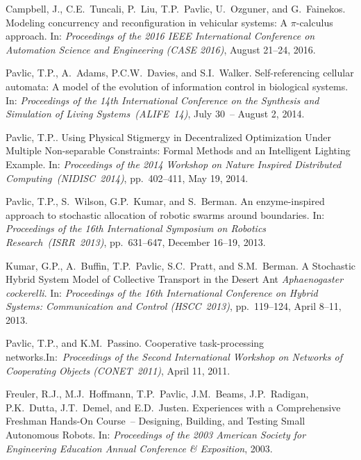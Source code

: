 \documentclass[10pt]{article}           %
\newcommand{\mathalt}[2]{#2}
\begin{document}
\begin{bibenum}
    \item Campbell, J., C.E.~Tuncali, P.~Liu, T.P.~Pavlic, U.~Ozguner,
        and G.~Fainekos. Modeling concurrency and reconfiguration in
        vehicular systems: A \mathalt{pi}{$\pi$}-calculus approach. In:
        \emph{Proceedings of the 2016 IEEE International Conference on
        Automation Science and Engineering (CASE 2016)}, August 21--24,
        2016.\\

    \item Pavlic, T.P., A.~Adams, P.C.W.~Davies, and S.I.~Walker.
        Self-referencing cellular automata: A model of the evolution of
        information control in biological systems.
        In: \emph{Proceedings of the 14th International Conference on
        the Synthesis and Simulation of Living Systems~(ALIFE~14)},
        July 30~-- August 2, 2014.\\

    \item Pavlic, T.P.. Using Physical Stigmergy in Decentralized
        Optimization Under Multiple Non-separable Constraints: Formal
        Methods and an Intelligent Lighting Example. In:
        \emph{Proceedings of the 2014 Workshop on Nature Inspired
        Distributed Computing~(NIDISC~2014)}, pp.~402--411, May 19, 2014.

    \item Pavlic, T.P., S.~Wilson, G.P.~Kumar, and S.~Berman.
        An enzyme-inspired approach to stochastic allocation of robotic
        swarms around boundaries. In: \emph{Proceedings of the 16th
        International Symposium on Robotics Research~(ISRR~2013)},
        pp.~631--647, December 16--19, 2013.

    \item Kumar, G.P., A.~Buffin, T.P.~Pavlic, S.C.~Pratt, and
        S.M.~Berman. A Stochastic Hybrid System Model of Collective
        Transport in the Desert Ant \emph{Aphaenogaster cockerelli}. In:
        \emph{Proceedings of the 16th International Conference on Hybrid
        Systems: Communication and Control (HSCC~2013)}, pp.~119--124,
        April 8--11, 2013. 

    \item Pavlic, T.P., and K.M.~Passino. Cooperative task-processing
        networks.\linebreak[4] In:~\emph{Proceedings of the Second
        International Workshop on Networks of Cooperating
        Objects (CONET~2011)}, April 11, 2011.

    \item Freuler, R.J., M.J.~Hoffmann, T.P.~Pavlic, J.M.~Beams,
        J.P.~Radigan, P.K.~Dutta, J.T.~Demel, and E.D.~Justen.
        Experiences with a Comprehensive Freshman Hands-On Course~--
        Designing, Building, and Testing Small Autonomous Robots. In:
        \emph{Proceedings of the 2003 American Society for Engineering
        Education Annual Conference \& Exposition}, 2003.

\end{bibenum}
\end{document}
